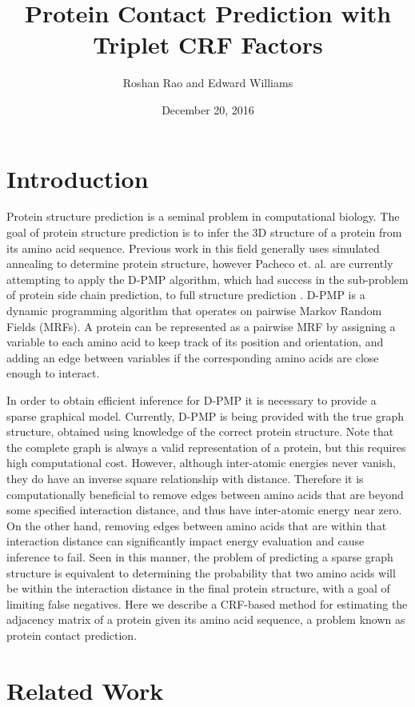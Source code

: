 \documentclass{article}
\title{Protein Contact Prediction with Triplet CRF Factors}
\date{December 20, 2016}
\author{Roshan Rao and Edward Williams}
\begin{document}
\maketitle
\section{Introduction}
\vspace*{-0.1in}
Protein structure prediction is a seminal problem in computational biology. The goal of protein structure prediction is to infer the 3D structure of a protein from its amino acid sequence. Previous work in this field generally uses simulated annealing to determine protein structure, however Pacheco et. al. are currently attempting to apply the D-PMP algorithm, which had success in the sub-problem of protein side chain prediction, to full structure prediction \cite{pacheco15}. D-PMP is a dynamic programming algorithm that operates on pairwise Markov Random Fields (MRFs). A protein can be represented as a pairwise MRF by assigning a variable to each amino acid to keep track of its position and orientation, and adding an edge between variables if the corresponding amino acids are close enough to interact. 

In order to obtain efficient inference for D-PMP it is necessary to provide a sparse graphical model. Currently, D-PMP is being provided with the true graph structure, obtained using knowledge of the correct protein structure. Note that the complete graph is always a valid representation of a protein, but this requires high computational cost. However, although inter-atomic energies never vanish, they do have an inverse square relationship with distance. Therefore it is computationally beneficial to remove edges between amino acids that are beyond some specified interaction distance, and thus have inter-atomic energy near zero. On the other hand, removing edges between amino acids that are within that interaction distance can significantly impact energy evaluation and cause inference to fail. Seen in this manner, the problem of predicting a sparse graph structure is equivalent to determining the probability that two amino acids will be within the interaction distance in the final protein structure, with a goal of limiting false negatives. Here we describe a CRF-based method for estimating the adjacency matrix of a protein given its amino acid sequence, a problem known as protein contact prediction.

\section{Related Work}
\end{document}
